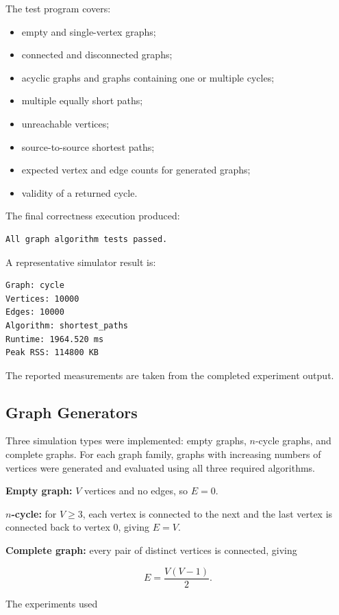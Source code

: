 \documentclass[11pt]{article}
\begin{document}
The test program covers:
\begin{itemize}
    \item empty and single-vertex graphs;
    \item connected and disconnected graphs;
    \item acyclic graphs and graphs containing one or multiple cycles;
    \item multiple equally short paths;
    \item unreachable vertices;
    \item source-to-source shortest paths;
    \item expected vertex and edge counts for generated graphs;
    \item validity of a returned cycle.
\end{itemize}

The final correctness execution produced:

\begin{verbatim}
All graph algorithm tests passed.
\end{verbatim}

A representative simulator result is:

\begin{verbatim}
Graph: cycle
Vertices: 10000
Edges: 10000
Algorithm: shortest_paths
Runtime: 1964.520 ms
Peak RSS: 114800 KB
\end{verbatim}

The reported measurements are taken from the completed experiment output.

\subsection{Graph Generators}

Three simulation types were implemented: empty graphs, $n$-cycle graphs,
and complete graphs. For each graph family, graphs with increasing numbers of
vertices were generated and evaluated using all three required algorithms.

\textbf{Empty graph:} $V$ vertices and no edges, so $E=0$.

\textbf{$n$-cycle:} for $V\geq3$, each vertex is connected to the next and the
last vertex is connected back to vertex $0$, giving $E=V$.

\textbf{Complete graph:} every pair of distinct vertices is connected, giving

\[
E=\frac{V(V-1)}{2}.
\]

The experiments used
\end{document}
